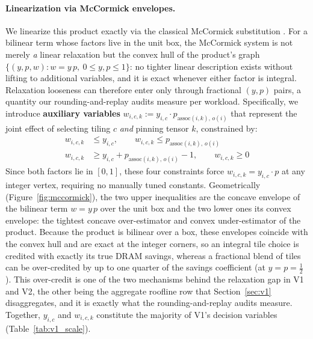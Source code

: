 \paragraph{Linearization via McCormick envelopes.}
We linearize this product exactly via the classical McCormick substitution \citep{mccormick1976computability}. For a bilinear term whose factors live in the unit box, the McCormick system is not merely \emph{a} linear relaxation but the convex hull of the product's graph $\{(y,p,w) : w = y\,p,\ 0 \le y,p \le 1\}$: no tighter linear description exists without lifting to additional variables, and it is exact whenever either factor is integral. Relaxation looseness can therefore enter only through fractional $(y,p)$ pairs, a quantity our rounding-and-replay audits measure per workload.
Specifically, we introduce \textbf{auxiliary variables} $w_{i,c,k} := y_{i,c} \cdot p_{\text{assoc}(i,k),\, o(i)}$ that represent the joint effect of selecting tiling $c$ \emph{and} pinning tensor $k$, constrained by:
\begin{equation}
\label{eq:mccormick}
\begin{aligned}
    w_{i,c,k} &\leq y_{i,c}, \qquad
    w_{i,c,k} \leq p_{\text{assoc}(i,k),\, o(i)} \\
    w_{i,c,k} &\geq y_{i,c} + p_{\text{assoc}(i,k),\, o(i)} - 1, \qquad
    w_{i,c,k} \geq 0
\end{aligned}
\end{equation}
Since both factors lie in $[0,1]$, these four constraints force $w_{i,c,k} = y_{i,c} \cdot p$ at any integer vertex, requiring no manually tuned constants.
Geometrically (Figure~\ref{fig:mccormick}), the two upper inequalities are the concave envelope of the bilinear term $w = y\,p$ over the unit box and the two lower ones its convex envelope: the tightest concave over-estimator and convex under-estimator of the product. Because the product is bilinear over a box, these envelopes coincide with the convex hull and are exact at the integer corners, so an integral tile choice is credited with exactly its true DRAM savings, whereas a fractional blend of tiles can be over-credited by up to one quarter of the savings coefficient (at $y = p = \tfrac12$). This over-credit is one of the two mechanisms behind the relaxation gap in V1 and V2, the other being the aggregate roofline row that Section~\ref{sec:v1} disaggregates, and it is exactly what the rounding-and-replay audits measure. Together, $y_{i,c}$ and $w_{i,c,k}$ constitute the majority of V1's decision variables (Table~\ref{tab:v1_scale}).

